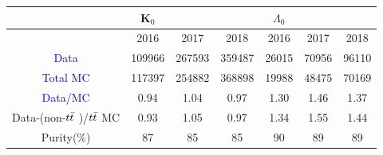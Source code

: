 \documentclass{cernatlasnote}
\begin{document}
  \begin{table}[h!]  
\begin{center}
  \begin{tabular}{|c|c|c|c||c|c|c|}
    \hline
    & K$_{0}$ & & &  $\Lambda_{0}$ & &\\
    \hline
      & 2016 & 2017 &2018 & 2016 & 2017 & 2018\\ \hline
   \textcolor{blue}{Data}  & 109966  & 267593 & 359487  &26015 &70956 &96110  \\
   \textcolor{blue}{ Total MC} & 117397   & 254882 & 368898 & 19988 & 48475 & 70169\\
   \textcolor{blue}{Data/MC}   & 0.94 & 1.04   &0.97 & 1.30 & 1.46& 1.37\\
   Data-(non-$t\Bar{t}$ )/$t\Bar{t}$  MC  & 0.93   & 1.05   &0.97 & 1.34 & 1.55 & 1.44\\
   Purity($\%$)  & 87    &85    &85    &90 &89  &89 \\
   \hline
 \end{tabular}
  \end{center}
  \end{table}
\end{document}
